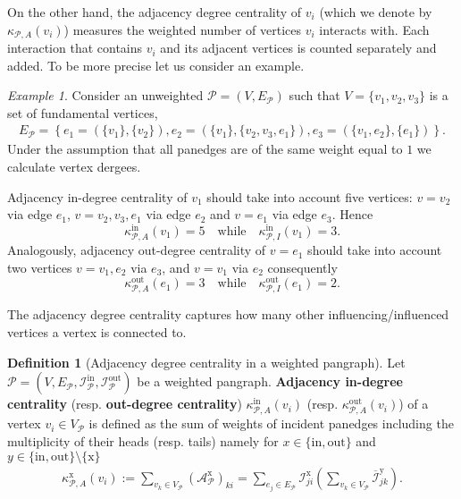 \documentclass[a4paper,12pt]{article}
\theoremstyle{definition}
\newtheorem{definition}{Definition}
\theoremstyle{remark}
\newtheorem{exam}{Example}
\newcommand{\mP}{\mathcal{P}}
\newcommand{\EP}{E_{\mathcal{P}}}
\newcommand{\tin}{\mathrm{in}}
\newcommand{\out}{\mathrm{out}}
\newcommand{\incip}{\mathcal{I}^{\tin}_{\mP}}
\newcommand{\incop}{\mathcal{I}^{\out}_{\mP}}
\begin{document}
On the other hand, the adjacency degree centrality of $v_i$ (which we denote by $\kappa_{\mP,A} (v_i)$) measures the weighted number of vertices $v_i$ interacts with. Each interaction that contains $v_i$ and its adjacent vertices is counted separately and added. To be more precise let us consider an example.

\begin{exam}\label{exam:I_A_degree}
Consider an unweighted $\mP=(V,\EP)$ such that $V=\{ v_1,v_2,v_3\}$ is a set of fundamental vertices, 
\begin{eqnarray*}
E_{\mP}=\left\{ e_1 = (\{v_1\},\{v_2\}), e_2 = (\{v_1\},\{v_2,v_3, e_1\} ), e_3 =(\{v_1,e_2\}, \{e_1\})\right\}.
\end{eqnarray*} 
Under the assumption that all panedges are of the same weight equal to $1$ we calculate vertex dergees.

Adjacency in-degree centrality of $v_1$ should take into account five vertices: $v=v_2$ via edge $e_1$, $v=v_2,v_3,e_1$ via edge $e_2$ and $v=e_1$ via edge $e_3$. Hence $$\kappa_{\mP,A}^{\tin}(v_1)=5\quad \textrm{while}\quad \kappa^{\tin}_{\mP,I}(v_1)=3.$$ 
Analogously, adjacency out-degree centrality of $v=e_1$ should take into account two vertices $v=v_1,e_2$ via $e_3$, and $v=v_1$ via $e_2$ consequently $$\kappa_{\mP,A}^{\out}(e_1)=3\quad \textrm{while} \quad \kappa^{\out}_{\mP,I}(e_1)=2.$$
\end{exam}

The adjacency degree centrality captures how many other influencing/influenced vertices a vertex is connected to.

\begin{definition}[Adjacency degree centrality in a weighted pangraph]\label{def:adj_deg}
     Let $\mP= (V,\EP, \incip,\incop)$ be a weighted pangraph. \textbf{Adjacency in-degree centrality} (resp. \textbf{out-degree centrality}) $ \kappa_{\mP,A}^{\tin}(v_i)$ (resp. $ \kappa_{\mP,A}^{\out}(v_i)$) of a vertex $v_i \in V_{\mP}$ is defined as the sum of weights of incident panedges including the multiplicity of their heads (resp. tails) namely for $x\in\{\textrm{in},\textrm{out}\}$ and $y\in\{\textrm{in},\textrm{out}\}\setminus\{\textrm{x}\}$
     \begin{eqnarray*}
        \kappa_{\mP,A}^{\textrm{x}}(v_i):=\sum_{v_k\in V_{\mP}}(\mathcal{A}^{\textrm{x}}_{\mP})_{ki}=\sum_{e_j\in E_{\mP}} \mathcal{I}^{\textrm{x}}_{ji}\left(\sum_{v_k\in V_{\mP}}  \overline{\mathcal{I}}^{\textrm{y}}_{jk}\right) .
    \end{eqnarray*}
\end{definition}
\end{document}
